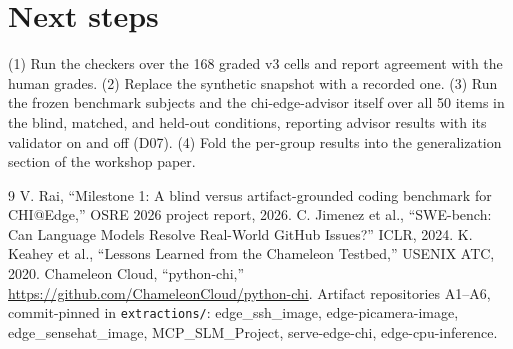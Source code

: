 \documentclass[conference]{IEEEtran}
\begin{document}
\section{Next steps}
(1) Run the checkers over the 168 graded v3 cells and report agreement with
the human grades. (2) Replace the synthetic snapshot with a recorded one.
(3) Run the frozen benchmark subjects and the chi-edge-advisor itself over all
50 items in the blind, matched, and held-out conditions, reporting advisor
results with its validator on and off (D07). (4) Fold the per-group results
into the generalization section of the workshop paper.

\begin{thebibliography}{9}
 V. Rai, ``Milestone 1: A blind versus artifact-grounded coding
benchmark for CHI@Edge,'' OSRE 2026 project report, 2026.
 C. Jimenez et al., ``SWE-bench: Can Language Models Resolve
Real-World GitHub Issues?'' ICLR, 2024.
 K. Keahey et al., ``Lessons Learned from the Chameleon
Testbed,'' USENIX ATC, 2020.
 Chameleon Cloud, ``python-chi,''
\url{https://github.com/ChameleonCloud/python-chi}.
 Artifact repositories A1--A6, commit-pinned in
\texttt{extractions/}: edge\_ssh\_image, edge-picamera-image,
edge\_sensehat\_image, MCP\_SLM\_Project, serve-edge-chi, edge-cpu-inference.
\end{thebibliography}
\end{document}
